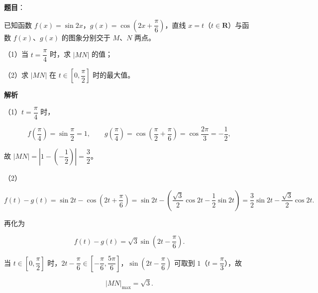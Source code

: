 \begin{answer}

\textbf{题目}：

已知函数 $f(x)=\sin2x$，$g(x)=\cos\left(2x+\dfrac{\pi}6\right)$，直线 $x=t$（$t\in\mathbf R$）与函数 $f(x)$、$g(x)$ 的图象分别交于 $M$、$N$ 两点。

（1）当 $t=\dfrac{\pi}4$ 时，求 $|MN|$ 的值；

（2）求 $|MN|$ 在 $t\in\left[0,\dfrac{\pi}2\right]$ 时的最大值。

\textbf{解析}

（1）$t=\dfrac{\pi}4$ 时，

\nopagebreak[4]
\[f\left(\frac{\pi}4\right)=\sin\frac{\pi}2=1,\qquad g\left(\frac{\pi}4\right)=\cos\left(\frac{\pi}2+\frac{\pi}6\right)=\cos\frac{2\pi}3=-\frac12,\]

故 $|MN|=\left|1-\left(-\dfrac12\right)\right|=\dfrac32$。

（2）

\nopagebreak[4]
\[f(t)-g(t)=\sin2t-\cos\left(2t+\frac{\pi}6\right)
=\sin2t-\left(\frac{\sqrt3}2\cos2t-\frac12\sin2t\right)
=\frac32\sin2t-\frac{\sqrt3}2\cos2t.\]

再化为

\nopagebreak[4]
\[f(t)-g(t)=\sqrt3\sin\left(2t-\frac{\pi}6\right).\]

当 $t\in\left[0,\dfrac{\pi}2\right]$ 时，$2t-\dfrac{\pi}6\in\left[-\dfrac{\pi}6,\dfrac{5\pi}6\right]$，$\sin\left(2t-\dfrac{\pi}6\right)$ 可取到 $1$（$t=\dfrac{\pi}3$），故

\nopagebreak[4]
\[|MN|_{\max}=\sqrt3.\]


\end{answer}
